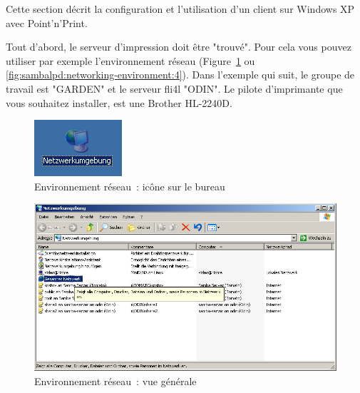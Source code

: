 

Cette section décrit la configuration et l'utilisation d'un client sur Windows XP
avec Point'n'Print.

Tout d'abord, le serveur d'impression doit être "trouvé". Pour cela vous pouvez
utiliser par exemple l'environnement réseau (Figure~\ref{fig:sambalpd:icon-networking-environment}
ou \ref{fig:sambalpd:networking-environment:4}). Dans l'exemple qui suit, le
groupe de travail est "GARDEN" et le serveur fli4l "ODIN". Le pilote d'imprimante
que vous souhaitez installer, est une Brother HL-2240D.

\begin{figure}[hbt!]
\centering
\includegraphics[]{image001}
\caption{Environnement réseau~: icône sur le bureau}
\label{fig:sambalpd:icon-networking-environment}
\end{figure}

\begin{figure}[hbt!]
\centering
\includegraphics[width=\columnwidth]{image002}
\caption{Environnement réseau~: vue générale}
\label{fig:sambalpd:networking-environment:1}
\end{figure}

